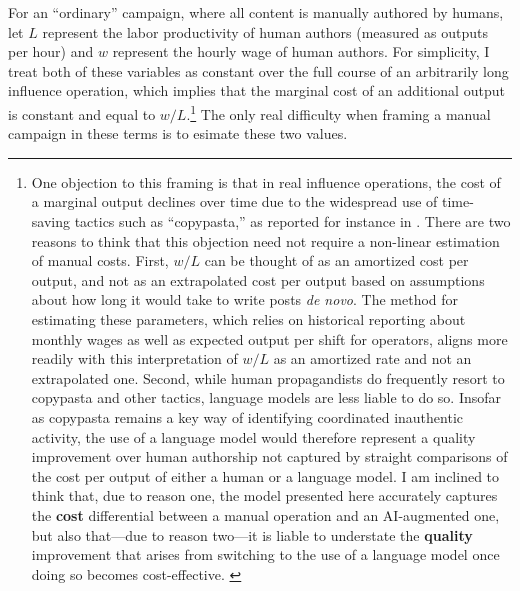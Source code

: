 \documentclass{article}
\begin{document}
For an ``ordinary'' campaign, where all content is manually authored by humans, let $L$ represent the labor productivity of human authors (measured as outputs per hour) and $w$ represent the hourly wage of human authors. For simplicity, I treat both of these variables as constant over the full course of an arbitrarily long influence operation, which implies that the marginal cost of an additional output is constant and equal to $w/L$.\footnote{One objection to this framing is that in real influence operations, the cost of a marginal output declines over time due to the widespread use of time-saving tactics such as ``copypasta,'' as reported for instance in \cite{siochina}. There are two reasons to think that this objection need not require a non-linear estimation of manual costs. First, $w/L$ can be thought of as an amortized cost per output, and not as an extrapolated cost per output based on assumptions about how long it would take to write posts \textit{de novo}. The method for estimating these parameters, which relies on historical reporting about monthly wages as well as expected output per shift for operators, aligns more readily with this interpretation of $w/L$ as an amortized rate and not an extrapolated one. Second, while human propagandists do frequently resort to copypasta and other tactics, language models are less liable to do so. Insofar as copypasta remains a key way of identifying coordinated inauthentic activity, the use of a language model would therefore represent a quality improvement over human authorship not captured by straight comparisons of the cost per output of either a human or a language model. I am inclined to think that, due to reason one, the model presented here accurately captures the \textbf{cost} differential between a manual operation and an AI-augmented one, but also that—due to reason two—it is liable to understate the \textbf{quality} improvement that arises from switching to the use of a language model once doing so becomes cost-effective. \label{fnquality}} The only real difficulty when framing a manual campaign in these terms is to esimate these two values.
\end{document}

